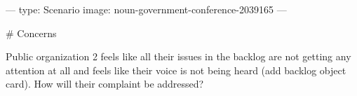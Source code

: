 ---
type: Scenario
image: noun-government-conference-2039165
---

# Concerns

Public organization 2 feels like all their issues in the backlog are not getting any attention at all and feels like their voice is not being heard (add backlog object card). How will their complaint be addressed?
